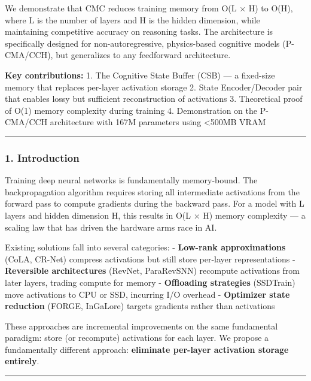 \documentclass[
  11pt,
  a4paper,
]{article}
\begin{document}
We demonstrate that CMC reduces training memory from O(L × H) to O(H),
where L is the number of layers and H is the hidden dimension, while
maintaining competitive accuracy on reasoning tasks. The architecture is
specifically designed for non-autoregressive, physics-based cognitive
models (P-CMA/CCH), but generalizes to any feedforward architecture.

\textbf{Key contributions:} 1. The Cognitive State Buffer (CSB) --- a
fixed-size memory that replaces per-layer activation storage 2. State
Encoder/Decoder pair that enables lossy but sufficient reconstruction of
activations 3. Theoretical proof of O(1) memory complexity during
training 4. Demonstration on the P-CMA/CCH architecture with 167M
parameters using \textless500MB VRAM

\begin{center}\rule{0.5\linewidth}{0.5pt}\end{center}

\subsubsection{1. Introduction}\label{introduction-2}

Training deep neural networks is fundamentally memory-bound. The
backpropagation algorithm requires storing all intermediate activations
from the forward pass to compute gradients during the backward pass. For
a model with L layers and hidden dimension H, this results in O(L × H)
memory complexity --- a scaling law that has driven the hardware arms
race in AI.

Existing solutions fall into several categories: - \textbf{Low-rank
approximations} (CoLA, CR-Net) compress activations but still store
per-layer representations - \textbf{Reversible architectures} (RevNet,
ParaRevSNN) recompute activations from later layers, trading compute for
memory - \textbf{Offloading strategies} (SSDTrain) move activations to
CPU or SSD, incurring I/O overhead - \textbf{Optimizer state reduction}
(FORGE, InGaLore) targets gradients rather than activations

These approaches are incremental improvements on the same fundamental
paradigm: store (or recompute) activations for each layer. We propose a
fundamentally different approach: \textbf{eliminate per-layer activation
storage entirely}.

\begin{center}\rule{0.5\linewidth}{0.5pt}\end{center}
\end{document}
